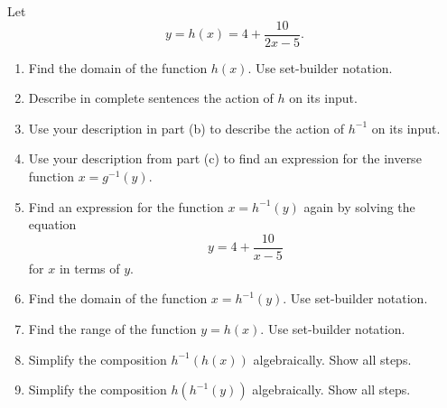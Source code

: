 \documentclass{ximera}
\begin{document}
\begin{question} \label{Exdfl3r4480}
Let
\[
    y =  h(x) = 4 + \frac{10}{2x-5} .
\]

\begin{enumerate}
\item Find the domain of the function $h(x)$. Use set-builder notation.

\item Describe in complete sentences the action of $h$ on its input.

\item Use your description in part (b) to describe the action of $h^{-1}$ on its input.

\item Use your description from part (c) to find an expression for the inverse function $x = g^{-1}(y)$.


\item Find an  expression for the function $x = h^{-1}(y)$ again by solving the equation 
\[
       y = 4 + \frac{10}{x-5}
\]
for $x$ in terms of $y$.

\item Find the domain of the function $x = h^{-1}(y)$. Use set-builder notation.

\item Find the range of the function $y = h(x)$. Use set-builder notation. 

\item Simplify the composition $h^{-1}(h(x))$ algebraically. Show all steps.

\item Simplify the composition $h(h^{-1}(y))$ algebraically. Show all steps.

\end{enumerate}
\end{question}
\end{document}
